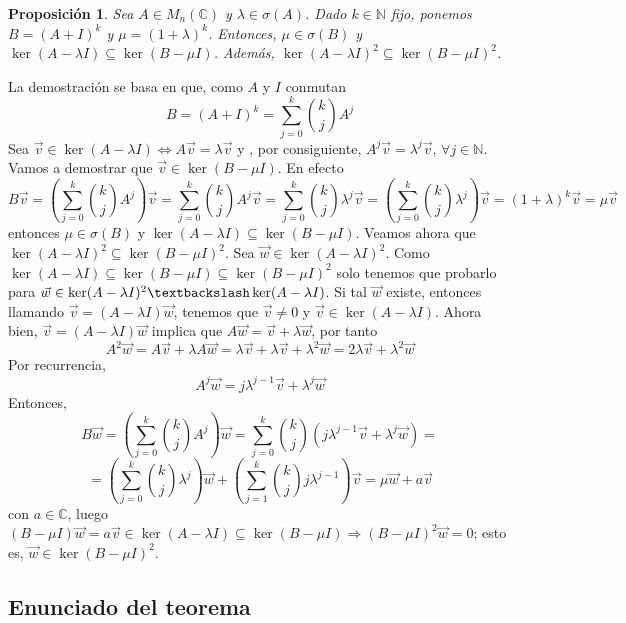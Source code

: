 \documentclass[size=a4, parskip=half, titlepage=false, toc=flat, toc=bib, 12pt, twoside]{scrartcl}
\makeatletter
\renewenvironment{proof}[1][\proofname] {\par\pushQED{\qed}\normalfont\topsep6\p@\@plus6\p@\relax\trivlist\item[\hskip\labelsep\itshape\tgpaella#1\@addpunct{.}]\ignorespaces}{\popQED\endtrivlist\@endpefalse}
\theoremstyle{theorem-style}
\newtheorem{nprop}{Proposición}[section]
\theoremstyle{definition-style}
\theoremstyle{remark-style}
\theoremstyle{example-style}
\theoremstyle{definition-style}
\theoremstyle{remark-style}
\renewcommand{\proofname}{\normalfont\tgpaella\bfseries\small DEMOSTRACIÓN}
\makeatother
\begin{document}
\begin{nprop}
\label{antes}
Sea $A\in M_n(\mathbb{C})$ y $\lambda \in \sigma(A)$. Dado $k \in \mathbb{N}$ fijo, ponemos $B = (A + I)^k$ y $\mu = (1 + \lambda)^k$. Entonces, $\mu \in \sigma(B)$ y $\ker(A - \lambda I) \subseteq \ker(B - \mu I)$. Además, $\ker(A - \lambda I)^2 \subseteq \ker(B - \mu I)^2$.
\end{nprop}
\begin{proof}
La demostración se basa en que, como $A$ y $I$ conmutan $$B = (A + I)^k = \sum_{j = 0}^k {k \choose j} A^j $$
Sea $\vec{v} \in \ker(A- \lambda I) \Leftrightarrow A \vec{v} = \lambda \vec{v}$ y , por consiguiente, $A^j \vec{v} = \lambda^j \vec{v}$, $\forall j \in \mathbb{N}$.
Vamos a demostrar que $\vec{v} \in \ker(B - \mu I)$. En efecto
$$B \vec{v} = \left( \sum_{j = 0}^k {k \choose j} A^j \right) \vec{v} = \sum_{j=0}^k {k \choose j} A^j \vec{v} = \sum_{j = 0}^k {k \choose j} \lambda^j \vec{v} = \left(\sum_{j = 0}^k {k \choose j} \lambda^j \right) \vec{v} = (1 + \lambda)^k \vec{v} = \mu \vec{v}$$
entonces $\mu \in \sigma(B)$ y $\ker(A - \lambda I) \subseteq \ker(B - \mu I)$.
Veamos ahora que $\ker(A - \lambda I)^2 \subseteq \ker(B - \mu I)^2$.
Sea $\vec{w} \in \ker(A - \lambda I)^2$. Como $\ker(A - \lambda I) \subseteq \ker(B - \mu I) \subseteq \ker(B - \mu I)^2$ solo tenemos que probarlo para $\vec{w} \in \ker(A - \lambda I)^2 \textbackslash \ker(A -\lambda I)$. Si tal $\vec{w}$ existe, entonces llamando $\vec{v} = (A - \lambda I)\vec{w}$, tenemos que   $\vec{v} \neq 0$ y $\vec{v} \in \ker(A - \lambda I)$.
Ahora bien, $\vec{v} = (A - \lambda I)\vec{w}$ implica que $A \vec{w} = \vec{v} + \lambda \vec{w}$, por tanto $$A^2 \vec{w} = A \vec{v} + \lambda A \vec{w} = \lambda \vec{v} + \lambda \vec{v} + \lambda^2 \vec{w} = 2 \lambda \vec{v} + \lambda^2 \vec{w}$$
Por recurrencia,
$$A^j \vec{w} = j \lambda^{j - 1} \vec{v} + \lambda^j \vec{w} $$
Entonces,
$$B \vec{w} = \left( \sum_{j = 0}^k {k \choose j} A^j \right)\vec{w} = \sum_{j = 0}^k {k \choose j} \left( j \lambda^{j - 1} \vec{v} + \lambda^j \vec{w} \right) =$$ $$= \left( \sum_{j=0}^k {k \choose j} \lambda^j \right) \vec{w} + \left(  \sum_{j = 1}^k {k \choose j} j \lambda^{j - 1} \right) \vec{v}  = \mu \vec{w} + a \vec{v}$$
con $a \in \mathbb{C}$, luego $(B - \mu I)\vec{w} = a \vec{v} \in \ker(A - \lambda I) \subseteq \ker(B - \mu I) \Rightarrow (B - \mu I)^2 \vec{w} = 0$; esto es, $\vec{w} \in \ker(B - \mu I)^2$.
\end{proof}

\newpage

\subsection{Enunciado del teorema}
\end{document}
